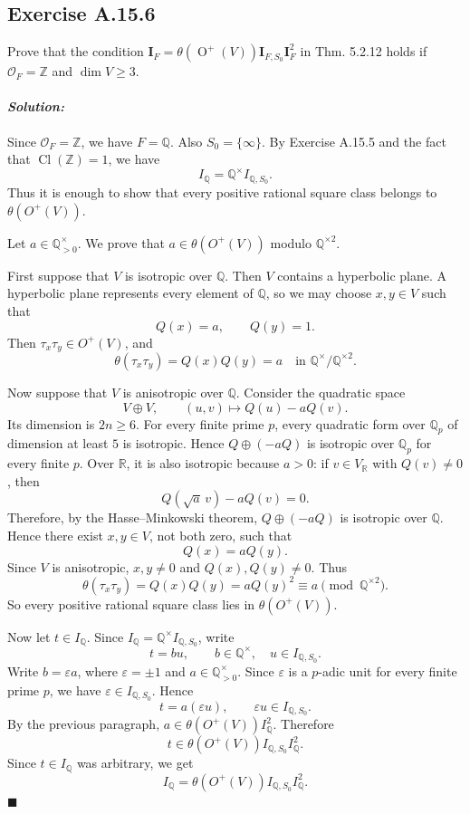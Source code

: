 \documentclass[12pt, a4paper]{article}
\newenvironment{solution}
  {\paragraph{\textit{Solution:}}\par\medskip}
  {\hfill$\blacksquare$\vspace{0.1cm}}
\begin{document}
\subsection*{Exercise A.15.6}
Prove that the condition $\mathbf{I}_F = \theta(\operatorname{O}^+(V))\mathbf{I}_{F, S_0} \mathbf{I}_F^2$ in Thm. 5.2.12 holds if $\mathcal{O}_F = \mathbb{Z}$ and $\dim V \ge 3$.
\begin{solution}
Since \(\mathcal O_F=\mathbb Z\), we have \(F=\mathbb Q\). Also
\(S_0=\{\infty\}\). By Exercise A.15.5 and the fact that
\(\operatorname{Cl}(\mathbb Z)=1\), we have
\[
I_{\mathbb Q}=\mathbb Q^\times I_{\mathbb Q,S_0}.
\]
Thus it is enough to show that every positive rational square class belongs to
\(\theta(O^+(V))\).

Let \(a\in\mathbb Q_{>0}^{\times}\). We prove that
\(a\in \theta(O^+(V))\) modulo \(\mathbb Q^{\times 2}\).

First suppose that \(V\) is isotropic over \(\mathbb Q\). Then \(V\) contains a
hyperbolic plane. A hyperbolic plane represents every element of
\(\mathbb Q\), so we may choose \(x,y\in V\) such that
\[
Q(x)=a,\qquad Q(y)=1.
\]
Then \(\tau_x\tau_y\in O^+(V)\), and
\[
\theta(\tau_x\tau_y)=Q(x)Q(y)=a
\quad \text{in } \mathbb Q^\times/\mathbb Q^{\times 2}.
\]

Now suppose that \(V\) is anisotropic over \(\mathbb Q\). Consider the quadratic
space
\[
V\oplus V,\qquad (u,v)\longmapsto Q(u)-aQ(v).
\]
Its dimension is \(2n\ge 6\). For every finite prime \(p\), every quadratic
form over \(\mathbb Q_p\) of dimension at least \(5\) is isotropic. Hence
\(Q\oplus(-aQ)\) is isotropic over \(\mathbb Q_p\) for every finite \(p\).
Over \(\mathbb R\), it is also isotropic because \(a>0\): if \(v\in V_\mathbb R\)
with \(Q(v)\neq 0\), then
\[
Q(\sqrt a\,v)-aQ(v)=0.
\]
Therefore, by the Hasse--Minkowski theorem, \(Q\oplus(-aQ)\) is isotropic over
\(\mathbb Q\). Hence there exist \(x,y\in V\), not both zero, such that
\[
Q(x)=aQ(y).
\]
Since \(V\) is anisotropic, \(x,y\neq 0\) and \(Q(x),Q(y)\neq 0\). Thus
\[
\theta(\tau_x\tau_y)=Q(x)Q(y)=aQ(y)^2
\equiv a \pmod{\mathbb Q^{\times 2}}.
\]
So every positive rational square class lies in \(\theta(O^+(V))\).

Now let \(t\in I_{\mathbb Q}\). Since
\(I_{\mathbb Q}=\mathbb Q^\times I_{\mathbb Q,S_0}\), write
\[
t=b u,\qquad b\in\mathbb Q^\times,\quad u\in I_{\mathbb Q,S_0}.
\]
Write \(b=\varepsilon a\), where \(\varepsilon=\pm 1\) and
\(a\in\mathbb Q_{>0}^{\times}\). Since \(\varepsilon\) is a \(p\)-adic unit for
every finite prime \(p\), we have \(\varepsilon\in I_{\mathbb Q,S_0}\). Hence
\[
t=a(\varepsilon u),
\qquad \varepsilon u\in I_{\mathbb Q,S_0}.
\]
By the previous paragraph, \(a\in \theta(O^+(V)) I_{\mathbb Q}^2\). Therefore
\[
t\in \theta(O^+(V))I_{\mathbb Q,S_0}I_{\mathbb Q}^2.
\]
Since \(t\in I_{\mathbb Q}\) was arbitrary, we get
\[
I_{\mathbb Q}
=
\theta(O^+(V))I_{\mathbb Q,S_0}I_{\mathbb Q}^2.
\]
\end{solution}
\end{document}
